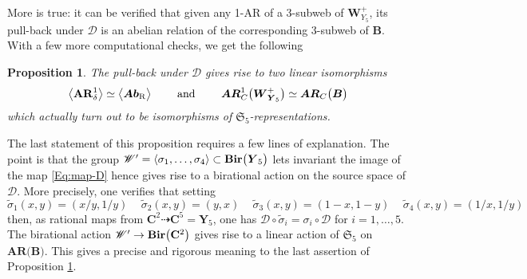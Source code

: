 \documentclass[11pt]{amsart}
\newtheorem{prop}[thm]{Proposition}
\begin{document}
More is true: it can be verified that given any 1-AR of a 3-subweb of  $\boldsymbol{W}^{+}_{ {Y}_5}$, its pull-back under $\mathcal D$ is an abelian relation of the corresponding 3-subweb of $\boldsymbol{B}$. With a few more  computational checks, we get the following
\begin{prop}
\label{Prop:W+-B}
 The pull-back under $\mathcal D$ gives rise to two linear isomorphisms 
$$
\big\langle {\bf AR}^1_\delta \big\rangle \simeq \big\langle \boldsymbol{Ab}_{\mathrm R} \big\rangle
\qquad 
\mbox{ and }  \qquad 
\boldsymbol{AR}^1_{C}\big( \boldsymbol{W}_{\boldsymbol{Y}_5}^{+}\big) 
\simeq \boldsymbol{AR}_{C}\big( \boldsymbol{B}\big) 
$$
which actually turn out to be isomorphisms of $\mathfrak S_5$-representations.
\end{prop}
The last statement of this proposition requires a few lines of explanation.  The point is that 
the group $\mathscr W'=\langle \sigma_1,\ldots,\sigma_4\rangle \subset {\bf Bir}\big(\boldsymbol{Y}_5\big)$ lets invariant the image of the map \eqref{Eq:map-D} hence gives rise to a birational action on the source space of $\mathcal D$. More precisely, one verifies that setting 
$$\tilde \sigma_1(x,y)=(x/y,1/y)\, \quad 
\tilde \sigma_2(x,y)=(y,x)\, \quad 
\tilde \sigma_3(x,y)=(1-x,1-y)\, \quad 
\tilde \sigma_4(x,y)=(1/x,1/y)$$
then,  as rational maps from 
$\mathbf C^2 \dashrightarrow \mathbf C^5=\boldsymbol{Y}_5$, 
 one has  $\mathcal D\circ \tilde \sigma_i= \sigma_i \circ \mathcal D$
 for $i=1,\ldots,5$.  The birational action $\mathscr W'\rightarrow  {\bf Bir}\big(\mathbf C^2\big)$ gives rise to a linear  action of $\mathfrak S_5$ on $\boldsymbol{AR}\big( \boldsymbol{B}
 \big)$. This gives a precise and rigorous meaning to the last assertion of Proposition \ref{Prop:W+-B}.
 
\end{document}
